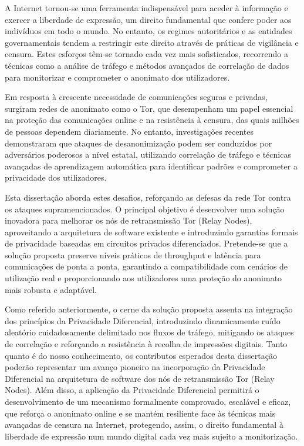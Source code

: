 
%


A Internet tornou-se uma ferramenta indispensável para aceder à informação e exercer a liberdade de expressão, um direito fundamental que confere poder aos indivíduos em todo o mundo. No entanto, os regimes autoritários e as entidades governamentais tendem a restringir este direito através de práticas de vigilância e censura. Estes esforços têm-se tornado cada vez mais sofisticados, recorrendo a técnicas como a análise de tráfego e métodos avançados de correlação de dados para monitorizar e comprometer o anonimato dos utilizadores.

Em resposta à crescente necessidade de comunicações seguras e privadas, surgiram redes de anonimato como o Tor, que desempenham um papel essencial na proteção das comunicações online e na resistência à censura, das quais milhões de pessoas dependem diariamente. No entanto, investigações recentes demonstraram que ataques de desanonimização podem ser conduzidos por adversários poderosos a nível estatal, utilizando correlação de tráfego e técnicas avançadas de aprendizagem automática para identificar padrões e comprometer a privacidade dos utilizadores.

Esta dissertação aborda estes desafios, reforçando as defesas da rede Tor contra os ataques supramencionados. O principal objetivo é desenvolver uma solução inovadora para melhorar os nós de retransmissão Tor (Relay Nodes), aproveitando a arquitetura de software existente e introduzindo garantias formais de privacidade baseadas em circuitos privados diferenciados. Pretende-se que a solução proposta preserve níveis práticos de throughput e latência para comunicações de ponta a ponta, garantindo a compatibilidade com cenários de utilização real e proporcionando aos utilizadores uma proteção do anonimato mais robusta e adaptável.

Como referido anteriormente, o cerne da solução proposta assenta na integração dos princípios da Privacidade Diferencial, introduzindo dinamicamente ruído aleatório cuidadosamente delimitado nos fluxos de tráfego, mitigando os ataques de correlação e reforçando a resistência à recolha de impressões digitais. Tanto quanto é do nosso conhecimento, os contributos esperados desta dissertação poderão representar um avanço pioneiro na incorporação da Privacidade Diferencial na arquitetura de software dos nós de retransmissão Tor (Relay Nodes).
Além disso, a aplicação da Privacidade Diferencial permitirá o desenvolvimento de um mecanismo formalmente comprovado, escalável e eficaz, que reforça o anonimato online e se mantém resiliente face às técnicas mais avançadas de censura na Internet, protegendo, assim, o direito fundamental à liberdade de expressão num mundo digital cada vez mais sujeito a monitorização.



